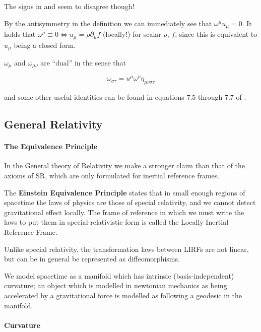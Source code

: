 \documentclass[main.tex]{subfiles}
\begin{document}
\begin{greenbox}
  The signs in \cite[]{Taub:1978} and \cite[]{Carroll:1997ar} seem to disagree though!
\end{greenbox}

By the antisymmetry in the definition we can immediately see that \(\omega^\mu u_\mu=0\). It holds that \(\omega^\mu \equiv 0 \iff u_\mu = \rho \partial_\mu f \) (locally!) for scalar \(\rho\), \(f\), since this is equivalent to \(u_\mu\) being a closed form.

\(\omega_\mu\) and \(\omega_{\mu \nu}\) are ``dual'' in the sense that

\begin{equation}
    \omega _{\sigma\tau} = u^\mu \omega^\nu \eta_{\mu \nu \sigma \tau}
\end{equation}

and some other useful identities can be found in equations 7.5 through 7.7 of \cite[]{Taub:1978}.

\subsection{General Relativity}

\paragraph{The Equivalence Principle}

In the General theory of Relativity we make a stronger claim than that of the axioms of SR, which are only formulated for inertial reference frames.

The \textbf{Einstein Equivalence Principle} states \cite[100]{Carroll:1997ar} that in small enough regions of spacetime the laws of physics are those of special relativity, and we cannot detect gravitational effect locally. The frame of reference in which we must write the laws to put them in special-relativistic form is called the Locally Inertial Reference Frame.

Unlike special relativity, the transformation laws between LIRFs are not linear, but can be in general be represented as diffeomorphisms.

We model spacetime as a manifold which has intrinsic (basis-independent) curvature; an object which is modelled in newtonian mechanics as being accelerated by a gravitational force is modelled as following a geodesic in the manifold.

\paragraph{Curvature}
\end{document}
